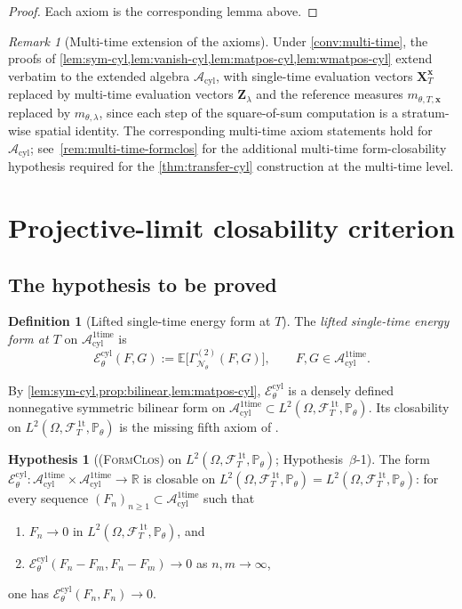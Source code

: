 \documentclass[11pt,reqno]{amsart}
\theoremstyle{plain}
\theoremstyle{definition}
\newtheorem{definition}[theorem]{Definition}
\newtheorem{hypothesis}[theorem]{Hypothesis}
\theoremstyle{remark}
\newtheorem{remark}[theorem]{Remark}
\newcommand{\R}{\mathbb R}
\newcommand{\E}{\mathbb E}
\newcommand{\Prob}{\mathbb P}
\newcommand{\cA}{\mathcal A}
\newcommand{\cE}{\mathcal E}
\newcommand{\cF}{\mathcal F}
\newcommand{\cN}{\mathcal N}
\newcommand{\Acyl}{\cA_{\mathrm{cyl}}}
\newcommand{\Aone}{\cA_{\mathrm{cyl}}^{\mathrm{1time}}}
\newcommand{\FT}{\cF_{T}^{\,\mathrm{1t}}}
\newcommand{\Hone}{L^{2}(\Omega,\FT,\Pth)}
\newcommand{\GamN}{\Gamma^{(2)}_{\cN_{\theta}}}
\newcommand{\Ecyl}{\cE_{\theta}^{\mathrm{cyl}}}
\newcommand{\Pth}{\Prob_{\theta}}
\begin{document}
\begin{proof}
Each axiom is the corresponding lemma above.
\end{proof}

\begin{remark}[Multi-time extension of the axioms]\label{rem:axioms-multi-extend}
Under \cref{conv:multi-time}, the proofs of
\cref{lem:sym-cyl,lem:vanish-cyl,lem:matpos-cyl,lem:wmatpos-cyl}
extend verbatim to the extended algebra $\Acyl$, with single-time
evaluation vectors $\mathbf X_{T}^{\mathbf x}$ replaced by
multi-time evaluation vectors $\mathbf Z_{\lambda}$ and the
reference measures $m_{\theta,T,\mathbf x}$ replaced by
$m_{\theta,\lambda}$, since each step of the square-of-sum
computation is a stratum-wise spatial identity. The corresponding
multi-time axiom statements hold for $\Acyl$;
see~\cref{rem:multi-time-formclos} for the additional multi-time
form-closability hypothesis required for the
\cref{thm:transfer-cyl} construction at the multi-time level.
\end{remark}

\section{Projective-limit closability criterion}\label{sec:formclos}

\subsection{The hypothesis to be proved}\label{sec:formclos-statement}

\begin{definition}[Lifted single-time energy form at $T$]\label{def:lifted-energy}
The \emph{lifted single-time energy form at $T$} on $\Aone$ is
\begin{equation}\label{eq:Eth-cyl}
  \Ecyl(F,G):=\E\bigl[\GamN(F,G)\bigr],\qquad F,G\in\Aone.
\end{equation}
\end{definition}

By \cref{lem:sym-cyl,prop:bilinear,lem:matpos-cyl}, $\Ecyl$ is a
densely defined nonnegative symmetric bilinear form on
$\Aone\subset\Hone$. Its closability on $\Hone$ is the missing fifth
axiom of \cite[Ass.~2.4]{GammaHierarchyDivergence}.

\begin{hypothesis}[\normalfont\textsc{(FormClos)} on $\Hone$;
Hypothesis~$\beta$-1]\label{hyp:beta1}
The form $\Ecyl\colon\Aone\times\Aone\to\R$ is closable on
$\Hone=L^{2}(\Omega,\FT,\Pth)$: for every sequence
$(F_{n})_{n\ge 1}\subset\Aone$ such that
\begin{enumerate}
\item[$(\mathrm a)$] $F_{n}\to 0$ in $\Hone$, and
\item[$(\mathrm b)$] $\Ecyl(F_{n}-F_{m},F_{n}-F_{m})\to 0$ as
$n,m\to\infty$,
\end{enumerate}
one has $\Ecyl(F_{n},F_{n})\to 0$.
\end{hypothesis}
\end{document}
